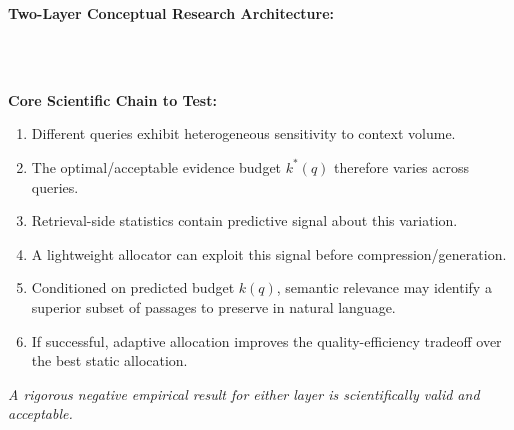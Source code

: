 \documentclass[11pt,a4paper]{article}
\begin{document}
\begin{center}
\small
{}
\end{center}

\vspace{0.15cm}
\noindent\textbf{Two-Layer Conceptual Research Architecture:}
\begin{center}
\small
{}
\\[0.5em]
\\[0.5em]
\end{center}

\noindent\textbf{Core Scientific Chain to Test:}
\begin{enumerate}[label=\textbf{\arabic*.}]
    \item Different queries exhibit heterogeneous sensitivity to context volume.
    \item The optimal/acceptable evidence budget $k^*(q)$ therefore varies across queries.
    \item Retrieval-side statistics contain predictive signal about this variation.
    \item A lightweight allocator can exploit this signal before compression/generation.
    \item Conditioned on predicted budget $k(q)$, semantic relevance may identify a superior subset of passages to preserve in natural language.
    \item If successful, adaptive allocation improves the quality-efficiency tradeoff over the best static allocation.
\end{enumerate}
\textit{A rigorous negative empirical result for either layer is scientifically valid and acceptable.}
\end{document}
